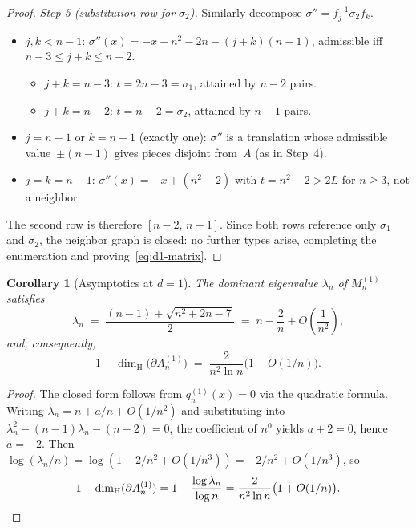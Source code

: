 \documentclass{amsart}
\newtheorem{corollary}[theorem]{Corollary}
\theoremstyle{definition}
\theoremstyle{remark}
\newcommand{\dH}{\dim_{\mathrm{H}}}
\begin{document}
\begin{proof}
\emph{Step 5 (substitution row for $\sigma_2$).}  Similarly
decompose $\sigma'' = f_j^{-1} \sigma_2 f_k$.
\begin{itemize}
\item $j, k < n{-}1$: $\sigma''(x) = -x + n^2 - 2n - (j+k)(n{-}1)$,
  admissible iff $n{-}3 \le j + k \le n{-}2$.
  \begin{itemize}
    \item $j + k = n{-}3$: $t = 2n{-}3 = \sigma_1$,
          attained by $n{-}2$ pairs.
    \item $j + k = n{-}2$: $t = n{-}2 = \sigma_2$,
          attained by $n{-}1$ pairs.
  \end{itemize}
\item $j = n{-}1$ or $k = n{-}1$ (exactly one): $\sigma''$ is a
  translation whose admissible value~$\pm(n{-}1)$ gives pieces
  disjoint from~$A$ (as in Step~4).
\item $j = k = n{-}1$: $\sigma''(x) = -x + (n^2{-}2)$ with
  $t = n^2 - 2 > 2L$ for $n \ge 3$, not a neighbor.
\end{itemize}
The second row is therefore $[n{-}2,\, n{-}1]$.  Since both rows
reference only $\sigma_1$ and $\sigma_2$, the neighbor graph is
closed: no further types arise, completing the enumeration and
proving~\eqref{eq:d1-matrix}.
\end{proof}

\begin{corollary}[Asymptotics at $d=1$]\label{cor:d1-asymp}
The dominant eigenvalue $\lambda_n$ of $M_n^{(1)}$ satisfies
\begin{equation}\label{eq:d1-lambda}
  \lambda_n \;=\; \frac{(n{-}1) + \sqrt{n^2 + 2n - 7}}{2}
            \;=\; n - \frac{2}{n} + O\!\left(\frac{1}{n^2}\right),
\end{equation}
and, consequently,
\begin{equation}\label{eq:d1-gap}
  1 - \dH\bigl(\partial A_n^{(1)}\bigr)
  \;=\; \frac{2}{n^2 \ln n}\bigl(1 + O(1/n)\bigr).
\end{equation}
\end{corollary}

\begin{proof}
The closed form follows from $q_n^{(1)}(x) = 0$ via the quadratic
formula.  Writing $\lambda_n = n + a/n + O(1/n^2)$ and substituting
into $\lambda_n^2 - (n{-}1)\lambda_n - (n{-}2) = 0$, the coefficient
of $n^0$ yields $a + 2 = 0$, hence $a = -2$.  Then
$\log(\lambda_n/n) = \log(1 - 2/n^2 + O(1/n^3)) = -2/n^2 + O(1/n^3)$,
so
\[
  1 - \dH(\partial A_n^{(1)})
  = 1 - \frac{\log\lambda_n}{\log n}
  = \frac{2}{n^2 \ln n}\bigl(1 + O(1/n)\bigr). \qedhere
\]
\end{proof}
\end{document}
